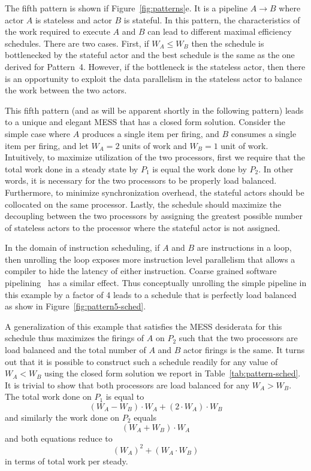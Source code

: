 The fifth pattern is shown if Figure~\ref{fig:patterns}e. It is a
pipeline $A\rightarrow B$ where actor $A$ is stateless and actor $B$
is stateful. In this pattern, the characteristics of the work required
to execute $A$ and $B$ can lead to different maximal efficiency
schedules.  There are two cases. First, if $W_A \le W_B$ then the
schedule is bottlenecked by the stateful actor and the best schedule
is the same as the one derived for Pattern~4. However, if the
bottleneck is the stateless actor, then there is an opportunity to
exploit the data parallelism in the stateless actor to balance the
work between the two actors.

This fifth pattern (and as will be apparent shortly in the following
pattern) leads to a unique and elegant MESS that has a closed form
solution. Consider the simple case where $A$ produces a single item
per firing, and $B$ consumes a single item per firing, and let $W_A =
2$ units of work and $W_B = 1$ unit of work. Intuitively, to maximize
utilization of the two processors, first we require that the total
work done in a steady state by $P_1$ is equal the work done by
$P_2$. In other words, it is necessary for the two processors to be
properly load balanced. Furthermore, to minimize synchronization
overhead, the stateful actors should be collocated on the same
processor. Lastly, the schedule should maximize the decoupling between
the two processors by assigning the greatest possible number of
stateless actors to the processor where the stateful actor is not
assigned.

In the domain of instruction scheduling, if $A$ and $B$ are
instructions in a loop, then unrolling the loop exposes more
instruction level parallelism that allows a compiler to hide the
latency of either instruction. Coarse grained software
pipelining~\cite{mgordon-aplos06} has a similar effect. Thus
conceptually unrolling the simple pipeline in this example by a factor
of 4 leads to a schedule that is perfectly load balanced as show in
Figure~\ref{fig:pattern5-sched}. 

A generalization of this example that satisfies the MESS desiderata
for this schedule thus maximizes the firings of $A$ on $P_2$ such that
the two processors are load balanced and the total number of $A$ and
$B$ actor firings is the same. It turns out that it is possible to
construct such a schedule readily for any value of $W_A < W_B$ using
the closed form solution we report in
Table~\ref{tab:pattern-sched}. It is trivial to show that both
processors are load balanced for any $W_A > W_B$. The total work done
on $P_1$ is equal to
\[
(W_A - W_B) \cdot W_A + (2 \cdot W_A) \cdot W_B
\]
and similarly the work done on $P_2$ equals
\[
(W_A + W_B) \cdot W_A
\]
and both equations reduce to 
\[
(W_A)^2 + (W_A \cdot W_B)
\]
in terms of total work per steady.

